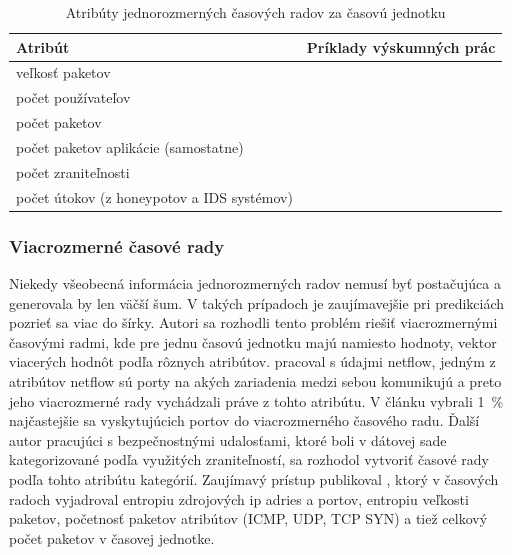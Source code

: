\documentclass[thesismargins, thesislinespacing, openright, upjsfrontpage, combineabstracts]{rnthesis}
\begin{document}
\begin{table}[]
    \centering
    \begin{tabular}{ | p{6cm} | p{8cm} | }
        \hline \textbf{Atribút} & \textbf{Príklady výskumných prác} \\
        \hline
        \hline veľkosť paketov & \cite{jiang2004detecting, wei2012intrusion,madan2018predicting, sang2002predictability,wang2008internet,hasegawa2001applications,cortez2012multi,hasegawa2001applications,papagiannaki2005long} \\
        \hline počet používateľov & \cite{jiang2004detecting} \\
        \hline počet paketov & \cite{jiang2004detecting} \\
        \hline počet paketov aplikácie \newline (samostatne) & \cite{jiang2004detecting} \\
        \hline počet zraniteľnosti & \cite{tang2016exploiting,roumani2015time,tang2018disclosure,tang2017big,pokhrel2017cybersecurity,werner2017time} \\
        \hline počet útokov \newline (z honeypotov a IDS systémov) & \cite{fang2019deep,zhan2015predicting,condon2008analysis,fang2019deep,condon2008analysis} \\
        \hline
    \end{tabular}
    \caption{Atribúty jednorozmerných časových radov za časovú jednotku}
    \label{tab:ts_uni}
\end{table}

\subsubsection{Viacrozmerné časové rady}

Niekedy všeobecná informácia jednorozmerných radov nemusí byť postačujúca a generovala by len väčší šum. V takých prípadoch je zaujímavejšie pri predikciách pozrieť sa viac do šírky. Autori \cite{shin2013advanced,ramaki2015real,marchette1999statistical} sa rozhodli tento problém riešiť viacrozmernými časovými radmi, kde pre jednu časovú jednotku majú namiesto hodnoty, vektor viacerých hodnôt podľa rôznych atribútov. \cite{marchette1999statistical} pracoval s údajmi netflow, jedným z atribútov netflow sú porty na akých zariadenia medzi sebou komunikujú a preto jeho viacrozmerné rady vychádzali práve z tohto atribútu. V článku vybrali 1~\% najčastejšie sa vyskytujúcich portov do viacrozmerného časového radu. Ďalší autor pracujúci s bezpečnostnými udalosťami, ktoré boli v dátovej sade kategorizované podľa využitých zraniteľností, sa rozhodol vytvoriť časové rady podľa tohto atribútu kategórií. Zaujímavý prístup publikoval \cite{shin2013advanced}, ktorý v časových radoch vyjadroval entropiu zdrojových ip adries a portov, entropiu veľkosti paketov, početnosť paketov atribútov (ICMP, UDP, TCP SYN) a tiež celkový počet paketov v časovej jednotke.
\end{document}
